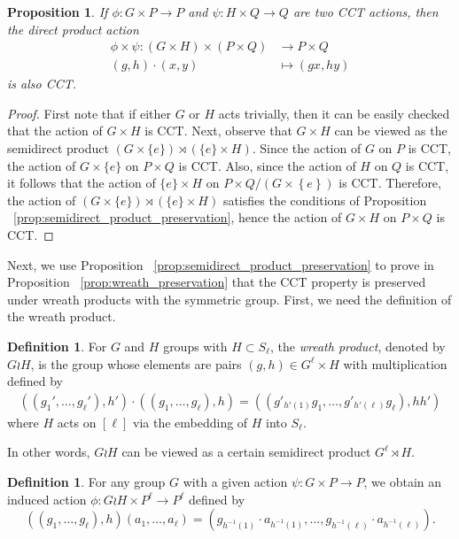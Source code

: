 \documentclass[smallextended, envcountsame, numbook]{svjour3}
\theoremstyle{plain}
\newtheorem{prop}[thm]{Proposition}
\theoremstyle{definition}
\newtheorem{defn}[thm]{Definition}
\theoremstyle{remark}
\numberwithin{equation}{section}
\begin{document}
\begin{prop}
\label{prop:direct_product_preservation}
If $\phi\colon G\times P\rightarrow P$ and $\psi\colon H \times Q \rightarrow Q$ are two CCT actions, then the direct product action 
\begin{align*}	
\phi \times \psi\colon(G\times H)\times (P\times Q) &\rightarrow P\times Q \\
(g,h)\cdot (x,y) &\mapsto (gx,hy)
\end{align*}
is also CCT.
\end{prop}

\begin{proof}
First note that if either $G$ or $H$ acts trivially, then it can be easily checked that the action of $G\times H$ is CCT.  Next, observe that $G \times H$ can be viewed as the semidirect product $(G\times \{e\}) \rtimes (\{e\} \times H)$. Since the action of $G$ on $P$ is CCT, the action of $G\times \{e\}$ on $P \times Q$ is CCT. Also, since the action of $H$ on $Q$ is CCT, it follows that the action of $\{e\}\times H$ on $P \times Q/(G \times \left\{ e \right\})$ is CCT. Therefore, the action of $(G\times \{e\}) \rtimes (\{e\} \times H)$ satisfies the conditions of Proposition ~\ref{prop:semidirect_product_preservation}, hence the action of $G\times H$ on $P \times Q$ is CCT.
\end{proof}

Next, we use Proposition ~\ref{prop:semidirect_product_preservation} to prove in Proposition ~\ref{prop:wreath_preservation} that the CCT property is preserved under wreath products with the symmetric group. First, we need the definition of the wreath product.

\begin{defn}
For $G$ and $H$ groups with $H \subset S_\ell$, the {\it wreath product}, denoted by $G \wr H$, is the group whose elements are pairs $(g,h) \in G^\ell\times H$ with multiplication defined by
\begin{align*}
((g_1',\ldots, g_\ell'),h') \cdot ((g_1,\ldots, g_\ell) ,h) =((g'_{h'(1)}g_1,\ldots, g'_{h'(\ell)}g_\ell),hh')
\end{align*}
where $H$ acts on $[\ell]$ via the embedding of $H$ into $S_\ell$.
\end{defn}

In other words, $G\wr H$ can be viewed as a certain semidirect product $G^\ell \rtimes H$.

\begin{defn}
\label{defn:wreath_action}
For any group $G$ with a given action $\psi\colon G\times P \rightarrow P$, we obtain an induced action $\phi\colon G \wr H \times P^\ell \rightarrow P^\ell$ defined by 
$$((g_1,\ldots, g_\ell),h)(a_1,\ldots, a_\ell) = (g_{h^{-1}(1)}\cdot a_{h^{-1}(1)},\ldots,g_{h^{-1}(\ell)} \cdot a_{h^{-1}(\ell)}).$$
\end{defn}
\end{document}
